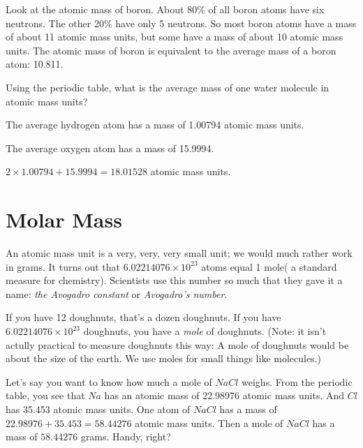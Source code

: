 Look at the atomic mass of boron. About 80\% of all boron atoms have
six neutrons. The other 20\% have only 5 neutrons. So most boron atoms
have a mass of about 11 atomic mass units, but some have a mass of
about 10 atomic mass units. The atomic mass of boron is equivalent to the average
mass of a boron atom: 10.811.

\begin{Exercise}[title={Mass of a Water Molecule}, label=water_mass]
  
Using the periodic table, what is the average mass of one water molecule in atomic mass units?

\end{Exercise}
\begin{Answer}[ref=water_mass]

  The average hydrogen atom has a mass of 1.00794 atomic mass units.

  The average oxygen atom has a mass of 15.9994.

  $2 \times 1.00794 + 15.9994 = 18.01528$ atomic mass units.
   
\end{Answer}

\section{Molar Mass}

An atomic mass unit is a very, very, very small unit; we would much
rather work in grams.  It turns out that $6.02214076 \times 10^{23}$
atoms equal 1 mole( a standard measure for chemistry). Scientists use this number so much
that they gave it a name: \textit{the Avogadro constant} or
\textit{Avogadro's number}.

If you have 12 doughnuts, that's a dozen doughnuts.  If you have
$6.02214076 \times 10^{23}$ doughnuts, you have a \textit{mole} of
doughnuts. (Note: it isn't actully practical to measure doughnuts this
way: A mole of doughnuts would be about the size of the earth. We use
moles for small things like molecules.)

Let's say you want to know how much a mole of $NaCl$ weighs. From the
periodic table, you see that $Na$ has an atomic mass of 22.98976
atomic mass units. And $Cl$ has 35.453 atomic mass units.  One atom of
$NaCl$ has a mass of $22.98976 + 35.453 = 58.44276$ atomic mass units.
Then a mole of $NaCl$ has a mass of $58.44276$ grams. Handy, right?

